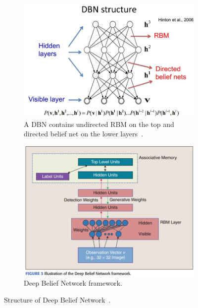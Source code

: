 	\begin{figure}[hbt]
	  \centering
  		\begin{subfigure}[t]{0.42\textwidth}
  			\includegraphics[width=\textwidth]{pics_sdbn/dbn.jpg}
  		    \caption{A DBN contains undirected RBM on the top and directed belief net on the lower layers~\cite{hinton2006fast}.}
  		\end{subfigure}
  		\begin{subfigure}[t]{0.42\textwidth}
  			\includegraphics[width=\textwidth]{pics_sdbn/dis.jpg}
  		    \caption{Deep Belief Network framework.}
  		\end{subfigure}
	  \caption{
	  Structure of Deep Belief Network~\cite{arel2010deep}.
	  }
	  \label{Fig:dbn}
	\end{figure}
	
